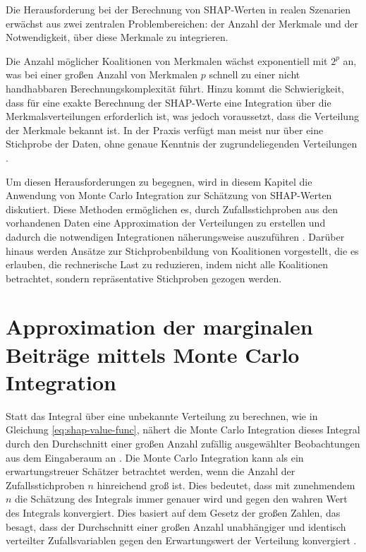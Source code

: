 Die Herausforderung bei der Berechnung von SHAP-Werten in realen Szenarien erwächst aus 
zwei zentralen Problembereichen: der Anzahl der Merkmale und der Notwendigkeit, 
über diese Merkmale zu integrieren. 

Die Anzahl möglicher Koalitionen von Merkmalen wächst exponentiell mit \( 2^p \) an, 
was bei einer großen Anzahl von Merkmalen \( p \) schnell zu einer nicht handhabbaren Berechnungskomplexität führt. 
Hinzu kommt die Schwierigkeit, dass für eine exakte Berechnung der SHAP-Werte eine Integration 
über die Merkmalsverteilungen erforderlich ist, was jedoch voraussetzt, dass die Verteilung der Merkmale bekannt ist. 
In der Praxis verfügt man meist nur über eine Stichprobe der Daten, ohne genaue Kenntnis der zugrundeliegenden Verteilungen \cite[S. 33]{Molnar_2023}.

Um diesen Herausforderungen zu begegnen, wird in diesem Kapitel die Anwendung von Monte Carlo Integration 
zur Schätzung von SHAP-Werten diskutiert. Diese Methoden ermöglichen es, durch Zufallsstichproben aus den vorhandenen Daten 
eine Approximation der Verteilungen zu erstellen und dadurch die notwendigen Integrationen näherungsweise auszuführen \cite[S. 34]{Molnar_2023}. 
Darüber hinaus werden Ansätze zur Stichprobenbildung von Koalitionen vorgestellt, die es erlauben, 
die rechnerische Last zu reduzieren, indem nicht alle Koalitionen betrachtet, sondern repräsentative Stichproben gezogen werden. 

\section{Approximation der marginalen Beiträge mittels Monte Carlo Integration}

Statt das Integral über eine unbekannte Verteilung zu berechnen, wie in Gleichung \ref{eq:shap-value-func},
nähert die Monte Carlo Integration dieses Integral durch den Durchschnitt einer großen Anzahl zufällig 
ausgewählter Beobachtungen aus dem Eingaberaum an \cite[S. 34]{Molnar_2023}. Die Monte Carlo Integration kann als ein erwartungstreuer Schätzer 
betrachtet werden, wenn die Anzahl der Zufallsstichproben $n$ hinreichend groß ist. Dies bedeutet, dass mit zunehmendem $n$ die Schätzung des Integrals 
immer genauer wird und gegen den wahren Wert des Integrals konvergiert. Dies basiert auf dem Gesetz der großen Zahlen, 
das besagt, dass der Durchschnitt einer großen Anzahl unabhängiger und identisch verteilter Zufallsvariablen gegen den Erwartungswert der Verteilung konvergiert \cite[S. 83]{Robert_Casella_2004}. 

